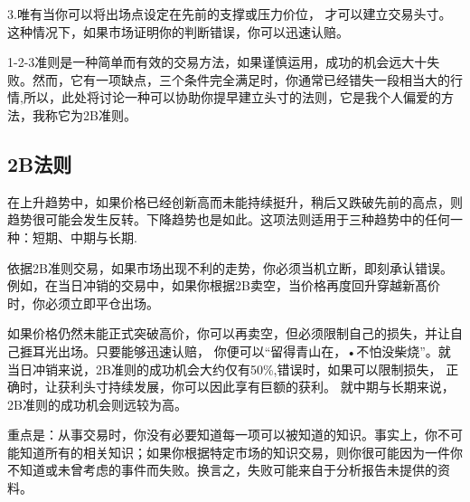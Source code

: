 3.唯有当你可以将出场点设定在先前的支撑或压力价位， 才可以建立交易头寸。这种情况下，如果市场证明你的判断错误，你可以迅速认赔。


1-2-3准则是一种简单而有效的交易方法，如果谨慎运用，成功的机会远大十失败。然而，它有一项缺点，三个条件完全满足时，你通常已经错失一段相当大的行情,所以，此处将讨论一种可以协助你提早建立头寸的法则，它是我个人偏爱的方法，我称它为2B准则。


\subsection*{2B法则}
在上升趋势中，如果价格已经创新高而未能持续挺升，稍后又跌破先前的高点，则趋势很可能会发生反转。下降趋势也是如此。这项法则适用于三种趋势中的任何一种：短期、中期与长期.


依据2B准则交易，如果市场出现不利的走势，你必须当机立断，即刻承认错误。例如，在当日冲销的交易中，如果你根据2B卖空，当价格再度回升穿越新髙价时，你必须立即平仓出场。

如果价格仍然未能正式突破高价，你可以再卖空，但必须限制自己的损失，并让自己捱耳光出场。只要能够迅速认赔， 你便可以“留得青山在，•不怕没柴烧”。就当日冲销来说，2B准则的成功机会大约仅有50\%,错误时，如果可以限制损失， 正确时，让获利头寸持续发展，你可以因此享有巨额的获利。 就中期与长期来说，2B准则的成功机会则远较为高。


重点是：从事交易时，你没有必要知道每一项可以被知道的知识。事实上，你不可能知道所有的相关知识；如果你根据特定市场的知识交易，则你很可能因为一件你不知道或未曾考虑的事件而失败。换言之，失败可能来自于分析报告未提供的资料。

